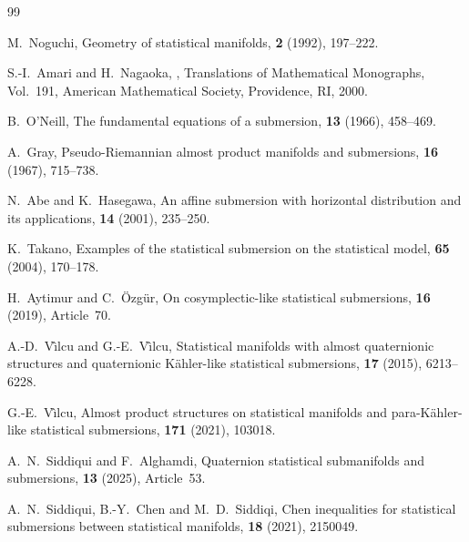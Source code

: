 \documentclass[10pt,a4paper]{article}
\theoremstyle{definition}
\theoremstyle{remark}
\numberwithin{equation}{section}
\begin{document}
\begin{thebibliography}{99}

M.~Noguchi,
\newblock Geometry of statistical manifolds,
 {\bf 2} (1992),
197--222.

S.-I.~Amari and H.~Nagaoka,
,
\newblock Translations of Mathematical Monographs, Vol.~191,
American Mathematical Society, Providence, RI, 2000.

B.~O'Neill,
\newblock The fundamental equations of a submersion,
 {\bf 13} (1966),
458--469.

A.~Gray,
\newblock Pseudo-Riemannian almost product manifolds and submersions,
 {\bf 16} (1967),
715--738.

N.~Abe and K.~Hasegawa,
\newblock An affine submersion with horizontal distribution and its
applications,
 {\bf 14}
(2001), 235--250.

K.~Takano,
\newblock Examples of the statistical submersion on the statistical model,
 {\bf 65} (2004), 170--178.

H.~Aytimur and C.~\"Ozg\"ur,
\newblock On cosymplectic-like statistical submersions,
 {\bf 16} (2019),
Article~70.

A.-D.~V\^{\i}lcu and G.-E.~V\^{\i}lcu,
\newblock Statistical manifolds with almost quaternionic structures and
quaternionic K\"ahler-like statistical submersions,
 {\bf 17} (2015), 6213--6228.

G.-E.~V\^{\i}lcu,
\newblock Almost product structures on statistical manifolds and
para-K\"ahler-like statistical submersions,
 {\bf 171} (2021),
103018.

A.~N.~Siddiqui and F.~Alghamdi,
\newblock Quaternion statistical submanifolds and submersions,
 {\bf 13} (2025), Article~53.

A.~N.~Siddiqui, B.-Y.~Chen and M.~D.~Siddiqi,
\newblock Chen inequalities for statistical submersions between statistical
manifolds,
{\bf 18} (2021), 2150049.


\end{thebibliography}
\end{document}
